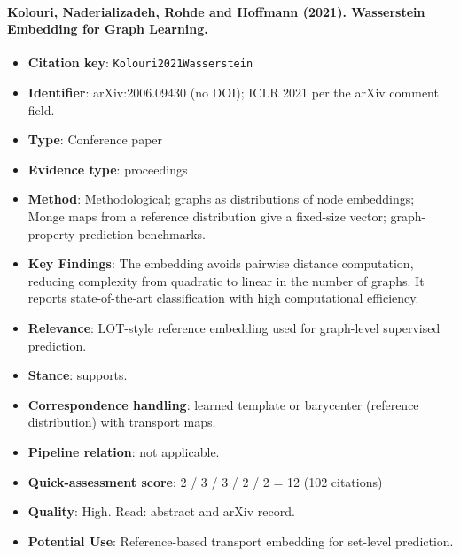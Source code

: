 \documentclass[journal,onecolumn]{IEEEtran}
\begin{document}
\paragraph{Kolouri, Naderializadeh, Rohde and Hoffmann (2021). Wasserstein Embedding for Graph Learning.~\cite{Kolouri2021Wasserstein}}\mbox{}

\begin{itemize}

\item{} \textbf{Citation key}: \texttt{Kolouri2021Wasserstein}

\item{} \textbf{Identifier}: arXiv:2006.09430 (no DOI); ICLR 2021 per the arXiv comment field.

\item{} \textbf{Type}: Conference paper

\item{} \textbf{Evidence type}: proceedings

\item{} \textbf{Method}: Methodological; graphs as distributions of node embeddings; Monge maps from a reference distribution give a fixed-size vector; graph-property prediction benchmarks.

\item{} \textbf{Key Findings}: The embedding avoids pairwise distance computation, reducing complexity from quadratic to linear in the number of graphs. It reports state-of-the-art classification with high computational efficiency.

\item{} \textbf{Relevance}: LOT-style reference embedding used for graph-level supervised prediction.

\item{} \textbf{Stance}: supports.

\item{} \textbf{Correspondence handling}: learned template or barycenter (reference distribution) with transport maps.

\item{} \textbf{Pipeline relation}: not applicable.

\item{} \textbf{Quick-assessment score}: 2 / 3 / 3 / 2 / 2 = 12 (102 citations)

\item{} \textbf{Quality}: High. Read: abstract and arXiv record.

\item{} \textbf{Potential Use}: Reference-based transport embedding for set-level prediction.

\end{itemize}
\end{document}
